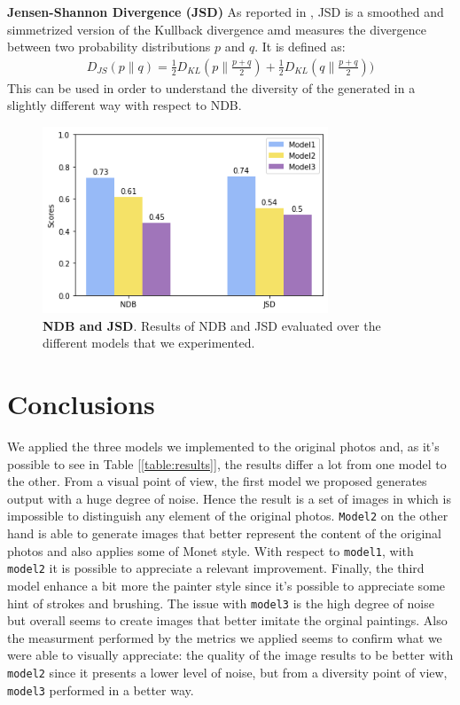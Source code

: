 \documentclass[10pt,twocolumn,letterpaper]{article}
\begin{document}
\textbf{Jensen-Shannon Divergence (JSD)} As reported in \cite{jsd}, JSD is a smoothed and simmetrized version of the Kullback divergence amd measures the divergence between two probability distributions $p$ and $q$. It is defined as: 
\begin{equation}
	\begin{split}
		D_{JS}(p\|q) = \frac{1}{2}D_{KL}(p\|\frac{p+q}{2})+  \frac{1}{2}D_{KL}(q\|\frac{p+q}{2}))
	\end{split}
\end{equation}
This can be used in order to understand the diversity of the generated in a slightly different way with respect to NDB.


\begin{figure}
	\includegraphics[width=23em]{index.png}
	\caption{\textbf{NDB and JSD}. Results of NDB and JSD evaluated over the different models that we experimented.}
	\label{figure:ndb-jsd}
\end{figure}

\section{Conclusions}
We applied the three models we implemented to the original photos and, as it's possible to see in Table [\ref{table:results}], the results differ a lot from one model to the other. From a visual point of view, the first model we proposed generates output with a huge degree of noise. Hence the result is a set of images in which is impossible to distinguish any element of the original photos. \texttt{Model2} on the other hand is able to generate images that better represent the content of the original photos and also applies some of Monet style. With respect to \texttt{model1}, with \texttt{model2} it is possible to appreciate a relevant improvement. Finally, the third model enhance a bit more the painter style since it's possible to appreciate some hint of strokes and brushing. The issue with \texttt{model3} is the high degree of noise but overall seems to create images that better imitate the orginal paintings. Also the measurment performed by the metrics we applied seems to confirm what we were able to visually appreciate: the quality of the image results to be better with \texttt{model2} since it presents a lower level of noise, but from a diversity point of view, \texttt{model3} performed in a better way.

{\small


}
\end{document}
